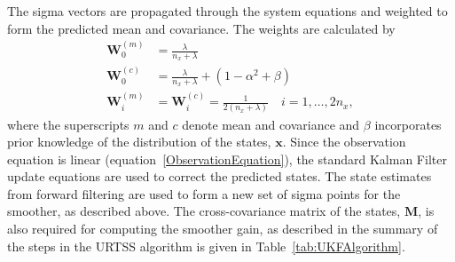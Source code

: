 \documentclass[review,authoryear,3p]{elsarticle}
\begin{document}
The sigma vectors are propagated through the system equations and weighted to form the predicted mean and covariance. The weights are calculated by 
\begin{align}
	\mathbf W_0^{(m)}&=\frac{\lambda}{ n_x+\lambda} \\
	\mathbf W_0^{(c)}&=\frac{\lambda}{ n_x+\lambda}+(1-\alpha^2+\beta) \\
	\mathbf W_i^{(m)}&=\mathbf W_i^{(c)}=\frac{1}{2( n_x+\lambda)} \quad i=1, \dots, 2n_x, 
\end{align}
where the superscripts $m$ and $c$ denote mean and covariance and $\beta$ incorporates prior knowledge of the distribution of the states, $\mathbf{x}$. Since the observation equation is linear (equation~\ref{ObservationEquation}), the standard Kalman Filter update equations are used to correct the predicted states. The state estimates from forward filtering are used to form a new set of sigma points for the smoother, as described above. The cross-covariance matrix of the states, $\mathbf M$, is also required for computing the smoother gain, as described in the summary of the steps in the URTSS algorithm is given in Table~\ref{tab:UKFAlgorithm}.
\end{document}
